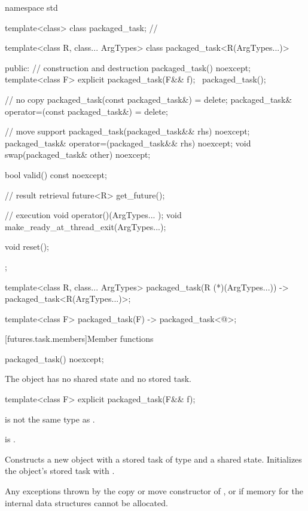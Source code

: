 %
\begin{codeblock}
namespace std {
  template<class> class packaged_task;  // \notdef

  template<class R, class... ArgTypes>
  class packaged_task<R(ArgTypes...)> {
  public:
    // construction and destruction
    packaged_task() noexcept;
    template<class F>
      explicit packaged_task(F&& f);
    ~packaged_task();

    // no copy
    packaged_task(const packaged_task&) = delete;
    packaged_task& operator=(const packaged_task&) = delete;

    // move support
    packaged_task(packaged_task&& rhs) noexcept;
    packaged_task& operator=(packaged_task&& rhs) noexcept;
    void swap(packaged_task& other) noexcept;

    bool valid() const noexcept;

    // result retrieval
    future<R> get_future();

    // execution
    void operator()(ArgTypes... );
    void make_ready_at_thread_exit(ArgTypes...);

    void reset();
  };

  template<class R, class... ArgTypes>
    packaged_task(R (*)(ArgTypes...)) -> packaged_task<R(ArgTypes...)>;

  template<class F> packaged_task(F) -> packaged_task<@\seebelow@>;
}
\end{codeblock}

[futures.task.members]{Member functions}

%
\begin{itemdecl}
packaged_task() noexcept;
\end{itemdecl}

\begin{itemdescr}
\pnum
\effects
The object has no shared state and no stored task.
\end{itemdescr}

%
\begin{itemdecl}
template<class F>
  explicit packaged_task(F&& f);
\end{itemdecl}

\begin{itemdescr}
\pnum
\constraints
{}
is not the same type as .

\pnum
\mandates
{} is .

\pnum
\effects
Constructs a new  object with
a stored task of type  and a shared state.
Initializes the object's stored task with .

\pnum
\throws
Any exceptions thrown by the copy or move constructor of , or
 if memory for the internal data structures
cannot be allocated.
\end{itemdescr}

